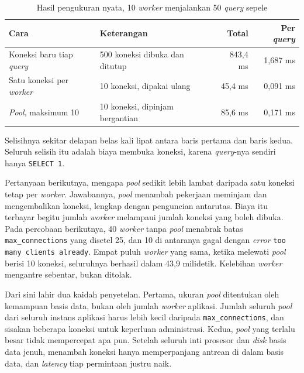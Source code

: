 \begin{table}[!htb]
  \centering
  \caption{Hasil pengukuran nyata, 10 \textit{worker} menjalankan 50 \textit{query} sepele}
  \label{tab:hasil-pool}
  \begin{tabularx}{\textwidth}{lXrr}
    \hline
    \textbf{Cara} & \textbf{Keterangan} & \textbf{Total} & \textbf{Per \textit{query}} \\
    \hline
    Koneksi baru tiap \textit{query} & 500 koneksi dibuka dan ditutup & 843,4 ms & 1,687 ms \\
    \hline
    Satu koneksi per \textit{worker} & 10 koneksi, dipakai ulang & 45,4 ms & 0,091 ms \\
    \hline
    \textit{Pool}, maksimum 10 & 10 koneksi, dipinjam bergantian & 85,6 ms & 0,171 ms \\
    \hline
  \end{tabularx}
\end{table}

Selisihnya sekitar delapan belas kali lipat antara baris pertama dan baris
kedua. Seluruh selisih itu adalah biaya membuka koneksi, karena \textit{query}-nya sendiri
hanya \texttt{SELECT 1}.

Pertanyaan berikutnya, mengapa \textit{pool} sedikit lebih lambat daripada satu koneksi
tetap per \textit{worker}. Jawabannya, \textit{pool} menambah pekerjaan meminjam dan
mengembalikan koneksi, lengkap dengan penguncian antarutas. Biaya itu terbayar
begitu jumlah \textit{worker} melampaui jumlah koneksi yang boleh dibuka. Pada
percobaan berikutnya, 40 \textit{worker} tanpa \textit{pool} menabrak batas
\texttt{max\_connections} yang disetel 25, dan 10 di antaranya gagal dengan
\textit{error} \texttt{too many clients already}. Empat puluh \textit{worker} yang sama, ketika
melewati \textit{pool} berisi 10 koneksi, seluruhnya berhasil dalam 43,9 milidetik.
Kelebihan \textit{worker} mengantre sebentar, bukan ditolak.

Dari sini lahir dua kaidah penyetelan. Pertama, ukuran \textit{pool} ditentukan oleh
kemampuan basis data, bukan oleh jumlah \textit{worker} aplikasi. Jumlah seluruh \textit{pool}
dari seluruh instans aplikasi harus lebih kecil daripada
\texttt{max\_connections}, dan sisakan beberapa koneksi untuk keperluan
administrasi. Kedua, \textit{pool} yang terlalu besar tidak mempercepat apa pun.
Setelah seluruh inti prosesor dan \textit{disk} basis data jenuh, menambah koneksi
hanya memperpanjang antrean di dalam basis data, dan \textit{latency} tiap permintaan
justru naik.

